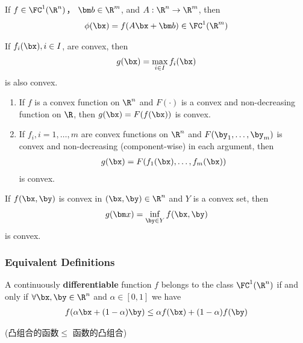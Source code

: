 \begin{lemma}
    If $f\in\FC^1(\R^n)$， $\bm b\in\R^m$, and $A:\R^n\to\R^m$, then 
    \begin{align*}
        \phi(\bx)=f(A\bx+\bm b)\in\FC^1(\R^m)
    \end{align*}
\end{lemma}

\begin{lemma}\quad

    If $f_i(\bx), i\in I$, are convex, then 
    \begin{align*}
        g(\bx)=\max_{i\in I}f_i(\bx)
    \end{align*}
    is also convex. 
\end{lemma}

\begin{lemma}\quad

    \begin{enumerate}
        \item If $f$ is a convex function on $\R^n$ and $F(\cdot)$ is a convex and non-decreasing function on $\R$, then $g(\bx)=F(f(\bx))$ is convex. 
        \item If $f_i,i=1,\dots,m$ are convex functions on $\R^n$ and $F(\by_1,\dots,\by_m)$ is convex and non-decreasing (component-wise) in each argument, then 
        \begin{align*}
            g(\bx)=F(f_1(\bx),\dots,f_m(\bx))
        \end{align*}
        is convex. 
    \end{enumerate}
\end{lemma}

\begin{lemma}
    If $f(\bx,\by)$ is convex in $(\bx,\by)\in\R^n$ and $Y$ is a convex set, then 
    \begin{align*}
        g(\bm x)=\inf_{\by\in Y}f(\bx,\by)
    \end{align*}
    is convex. 
\end{lemma}


\subsubsection{Equivalent Definitions}

\begin{theorem}
    A continuously \textbf{differentiable} function $f$ belongs to the class $\FC^1(\R^n)$ if and only if $\forall \bx,\by\in\R^n$ and $\alpha\in [0,1]$ we have
    \begin{align*}
        f(\alpha \bx+(1-\alpha )\by)\le \alpha f(\bx)+(1-\alpha)f(\by)
    \end{align*}
\end{theorem}
(凸组合的函数$\le$ 函数的凸组合)%

